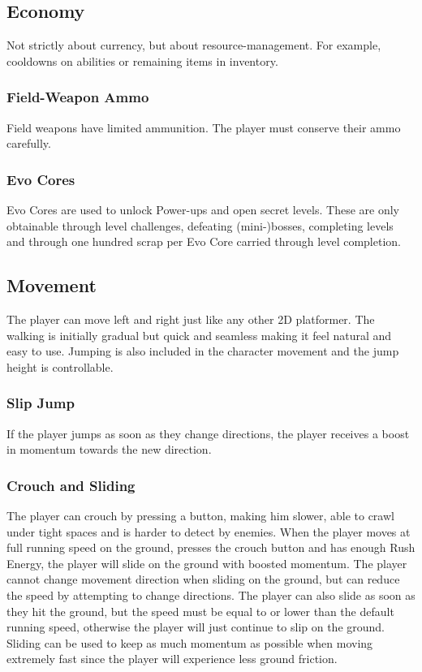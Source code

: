\documentclass[12pt]{article}
\begin{document}
\subsection{Economy}

Not strictly about currency, but about resource-management. For example, cooldowns on abilities or remaining items in inventory. 

\subsubsection{Field-Weapon Ammo}

Field weapons have limited ammunition. The player must conserve their ammo carefully.

\subsubsection{Evo Cores}

Evo Cores are used to unlock Power-ups and open secret levels. These are only obtainable through level challenges, defeating (mini-)bosses, completing levels and through one hundred scrap per Evo Core carried through level completion. 

\subsection{Movement}

The player can move left and right just like any other 2D platformer. The walking is initially gradual but quick and seamless making it feel natural and easy to use. Jumping is also included in the character movement and the jump height is controllable.

\subsubsection{Slip Jump}

If the player jumps as soon as they change directions, the player receives a boost in momentum towards the new direction.

\subsubsection{Crouch and Sliding}

The player can crouch by pressing a button, making him slower, able to crawl under tight spaces and is harder to detect by enemies. When the player moves at full running speed on the ground, presses the crouch button and has enough Rush Energy, the player will slide on the ground with boosted momentum. The player cannot change movement direction when sliding on the ground, but can reduce the speed by attempting to change directions. The player can also slide as soon as they hit the ground, but the speed must be equal to or lower than the default running speed, otherwise the player will just continue to slip on the ground. Sliding can be used to keep as much momentum as possible when moving extremely fast since the player will experience less ground friction. 
\end{document}
